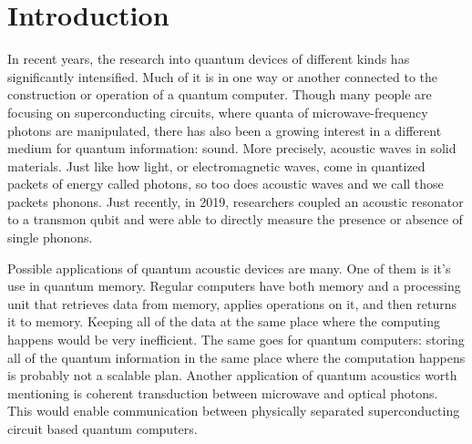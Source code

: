 \chapter{Introduction}


In recent years, the research into quantum devices of different kinds has
significantly intensified.
Much of it is in one way or another connected to the
construction or operation of a quantum computer.
Though many people are focusing on superconducting circuits, where quanta of
microwave-frequency photons are manipulated, there has also been
a growing interest in a different medium for quantum information: sound.
More precisely, acoustic waves in solid materials.
Just like how light, or electromagnetic waves, come in quantized packets of energy called
photons,
so too does acoustic waves and we call those packets phonons.
Just recently, in 2019, researchers coupled an acoustic resonator to a transmon
qubit and were able to directly measure the presence or absence of single
phonons.

Possible applications of quantum acoustic devices are many.
One of them is it's use in quantum memory.
Regular computers have both memory and a processing unit that
retrieves data from memory, applies operations on it, and then returns it to
memory.
Keeping all of the data at the same place where the computing happens would be
very inefficient.
The same goes for quantum computers: storing all of the quantum information in
the same place where the computation happens is probably not a scalable plan.
Another application of quantum acoustics worth mentioning is
coherent transduction between microwave and optical photons.
This would enable communication between physically separated superconducting
circuit based quantum computers.

